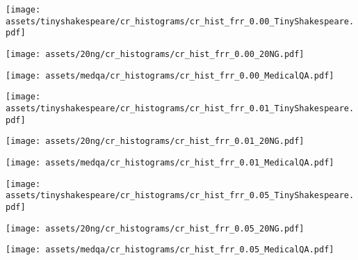     \centering
    \begin{minipage}{0.32\textwidth}
        \centering
        \texttt{[image: assets/tinyshakespeare/cr\_histograms/cr\_hist\_frr\_0.00\_TinyShakespeare.pdf]}
    \end{minipage}%
    \hfill
    \begin{minipage}{0.32\textwidth}
        \centering
        \texttt{[image: assets/20ng/cr\_histograms/cr\_hist\_frr\_0.00\_20NG.pdf]}
    \end{minipage}%
    \hfill
    \begin{minipage}{0.32\textwidth}
        \centering
        \texttt{[image: assets/medqa/cr\_histograms/cr\_hist\_frr\_0.00\_MedicalQA.pdf]}
    \end{minipage}%
    
    \begin{minipage}{0.32\textwidth}
        \centering
        \texttt{[image: assets/tinyshakespeare/cr\_histograms/cr\_hist\_frr\_0.01\_TinyShakespeare.pdf]}
    \end{minipage}%
    \hfill
    \begin{minipage}{0.32\textwidth}
        \centering
        \texttt{[image: assets/20ng/cr\_histograms/cr\_hist\_frr\_0.01\_20NG.pdf]}
    \end{minipage}%
    \hfill
    \begin{minipage}{0.32\textwidth}
        \centering
        \texttt{[image: assets/medqa/cr\_histograms/cr\_hist\_frr\_0.01\_MedicalQA.pdf]}
    \end{minipage}%
    
    \begin{minipage}{0.32\textwidth}
        \centering
        \texttt{[image: assets/tinyshakespeare/cr\_histograms/cr\_hist\_frr\_0.05\_TinyShakespeare.pdf]}
    \end{minipage}%
    \hfill
    \begin{minipage}{0.32\textwidth}
        \centering
        \texttt{[image: assets/20ng/cr\_histograms/cr\_hist\_frr\_0.05\_20NG.pdf]}
    \end{minipage}%
    \hfill
    \begin{minipage}{0.32\textwidth}
        \centering
        \texttt{[image: assets/medqa/cr\_histograms/cr\_hist\_frr\_0.05\_MedicalQA.pdf]}
    \end{minipage}%
    
